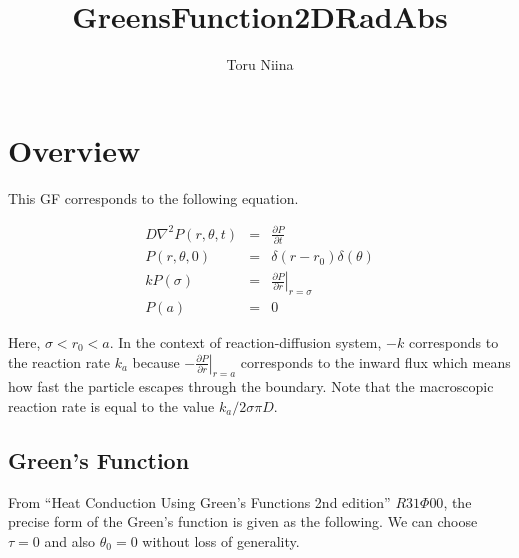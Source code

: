 \documentclass{article}
\begin{document}
\title{GreensFunction2DRadAbs}
\author{Toru Niina}
\maketitle

\section{Overview}

This GF corresponds to the following equation.

\begin{eqnarray}
    D\nabla^2 P(r, \theta, t) &=& \frac{\partial P}{\partial t}\\
    P(r, \theta, 0) &=& \delta(r - r_0)\delta(\theta) \\
    kP(\sigma) &=& \left.\frac{\partial P}{\partial r}\right|_{r=\sigma} \\
    P(a)  &=& 0
\end{eqnarray}

Here, $\sigma < r_0 < a$. In the context of reaction-diffusion system,
$-k$ corresponds to the reaction rate $k_a$ because
$-\left.\frac{\partial P}{\partial r}\right|_{r=a}$ corresponds to the inward
flux which means how fast the particle escapes through the boundary. Note that
the macroscopic reaction rate is equal to the value $k_a / 2\sigma\pi D$.

\subsection{Green's Function}

From ``Heat Conduction Using Green's Functions 2nd edition'' $R31\Phi00$,
the precise form of the Green's function is given as the following.
We can choose $\tau = 0$ and also $\theta_0 = 0$ without loss of generality.
\end{document}
